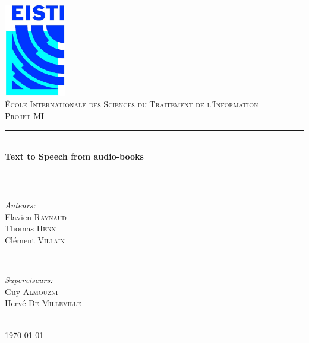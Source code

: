 \newcommand{\HRule}{\rule{\linewidth}{0.5mm}}

\begin{titlepage}
	\begin{center}
	
	\includegraphics[width=0.2\textwidth]{contents/img/logo.jpg}~\\[1cm]
	
	\textsc{\LARGE École Internationale des Sciences du Traitement de l'Information}\\[1.5cm]
	
	\textsc{\Large Projet MI}\\[0.5cm]
	
	\HRule \\[0.4cm]
	{ \huge \bfseries Text to Speech from audio-books \\[0.4cm] }
	
	\HRule \\[1.5cm]
	
	\noindent
	\begin{minipage}{0.4\textwidth}
		\begin{flushleft} \large
			\emph{Auteurs:}\\
			Flavien \textsc{Raynaud} \\
			Thomas \textsc{Henn} \\
			Clément \textsc{Villain}
		\end{flushleft}
	\end{minipage}
	~
	\begin{minipage}{0.4\textwidth}
		\begin{flushright} \large
			\emph{Superviseurs:} \\
			Guy \textsc{Almouzni} \\
			Hervé \textsc{De Milleville} \\
			~\\
		\end{flushright}
	\end{minipage}

	\vfill

	{\large \today}
	\end{center}
\end{titlepage}